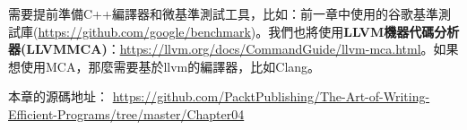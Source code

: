 需要提前準備C++編譯器和微基準測試工具，比如：前一章中使用的谷歌基準測試庫(\url{https://github.com/google/benchmark})。我們也將使用\textbf{LLVM機器代碼分析器(LLVMMCA)}：\url{https://llvm.org/docs/CommandGuide/llvm-mca.html}。如果想使用MCA，那麼需要基於llvm的編譯器，比如Clang。

本章的源碼地址： \url{https://github.com/PacktPublishing/The-Art-of-Writing-Efficient-Programs/tree/master/Chapter04}